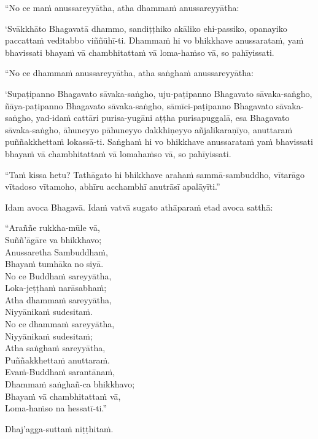 “No ce maṁ anussareyyātha, atha dhammaṁ anussareyyātha:

‘Svākkhāto Bhagavatā dhammo, sandiṭṭhiko akāliko ehi-passiko, opanayiko
paccattaṁ veditabbo viññūhī-ti. Dhammaṁ hi vo bhikkhave anussarataṁ, yaṁ
bhavissati bhayaṁ vā chambhitattaṁ vā loma-haṁso vā, so pahīyissati.

“No ce dhammaṁ anussareyyātha, atha saṅghaṁ anussareyyātha:

‘Supaṭipanno Bhagavato sāvaka-saṅgho, uju-paṭipanno Bhagavato sāvaka-saṅgho,
ñāya-paṭipanno Bhagavato sāvaka-saṅgho, sāmīci-paṭipanno Bhagavato
sāvaka-saṅgho, yad-idaṁ cattāri purisa-yugāni aṭṭha purisapuggalā, esa Bhagavato
sāvaka-saṅgho, āhuneyyo pāhuneyyo dakkhiṇeyyo añjalikaraṇīyo, anuttaraṁ
puññakkhettaṁ lokassā-ti. Saṅghaṁ hi vo bhikkhave anussarataṁ yaṁ bhavissati
bhayaṁ vā chambhitattaṁ vā lomahaṁso vā, so pahīyissati.

“Taṁ kissa hetu? Tathāgato hi bhikkhave arahaṁ sammā-sambuddho, vītarāgo
vītadoso vītamoho, abhīru acchambhī anutrāsī apalāyīti.”

Idam avoca Bhagavā. Idaṁ vatvā sugato athāparaṁ etad avoca satthā:

“Araññe rukkha-mūle vā,\\
Suññ’āgāre va bhikkhavo;\\
Anussaretha Sambuddhaṁ,\\
Bhayaṁ tumhāka no siyā.\\
No ce Buddhaṁ sareyyātha,\\
Loka-jeṭṭhaṁ narāsabhaṁ;\\
Atha dhammaṁ sareyyātha,\\
Niyyānikaṁ sudesitaṁ.\\
No ce dhammaṁ sareyyātha,\\
Niyyānikaṁ sudesitaṁ;\\
Atha saṅghaṁ sareyyātha,\\
Puññakkhettaṁ anuttaraṁ.\\
Evaṁ-Buddhaṁ sarantānaṁ,\\
Dhammaṁ saṅghañ-ca bhikkhavo;\\
Bhayaṁ vā chambhitattaṁ vā,\\
Loma-haṁso na hessatī-ti.”

Dhaj’agga-suttaṁ niṭṭhitaṁ.


